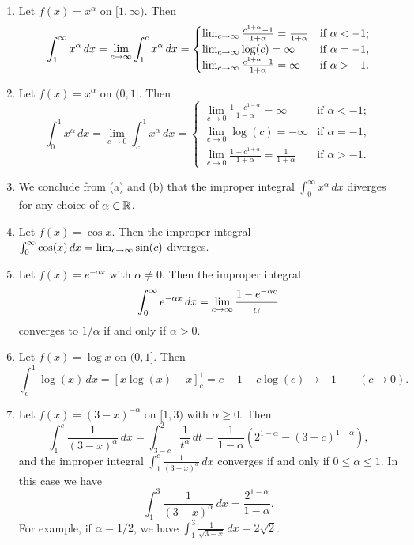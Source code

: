 \documentclass[10pt, a4paper]{article}
\begin{document}
\begin{enumerate}[label = (\alph*)]
    \item Let $f(x) = x ^ {\alpha}$ on $[1, \infty)$.
    Then
    \[
    \int_{1}^{\infty}x ^ {\alpha}\,dx = \liminfty[c]\int_{1}^{c}x ^ {\alpha}\,dx =
    \begin{cases}
        \liminfty[c]\frac{c ^ {1 + \alpha} - 1}{1 + \alpha} = \frac{1}{1 + \alpha} &\text{if } \alpha < -1; \\
        \liminfty[c]\log(c) = \infty &\text{if } \alpha = -1, \\
        \liminfty[c]\frac{c ^ {1 + \alpha} - 1}{1 + \alpha} = \infty &\text{if } \alpha > -1.
    \end{cases}
    \]
    
    \item Let $f(x) = x ^ {\alpha}$ on $(0, 1]$.
    Then
    \[
    \int_{0}^{1}x ^ {\alpha}\,dx = \lim_{c \rightarrow 0}\int_{c}^{1}x ^ {\alpha}\,dx =
    \begin{cases}
        \lim_{c \rightarrow 0}\frac{1 - c ^ {1 - \alpha}}{1 - \alpha} = \infty &\text{if } \alpha < -1; \\
        \lim_{c \rightarrow 0}\log(c) = -\infty &\text{if } \alpha = -1, \\
        \lim_{c \rightarrow 0}\frac{1 - c ^ {1 + \alpha}}{1 + \alpha} = \frac{1}{1 + \alpha} &\text{if } \alpha > -1.
    \end{cases}
    \]
    
    \item We conclude from (a) and (b) that the improper integral $\int_{0}^{\infty}x ^ {\alpha}\,dx$ diverges for any choice of $\alpha \in \R$.
    
    \item Let $f(x) = \cos{x}$.
    Then the improper integral $\int_{0}^{\infty}\cos(x)\,dx = \liminfty[c]\sin(c)$ diverges.

    \item Let $f(x) = e ^ {-\alpha x}$ with $\alpha \neq 0$.
    Then the improper integral
    \[
    \int_{0}^{\infty}e ^ {-\alpha x}\,dx = \liminfty[c]\frac{1 - e ^ {-\alpha c}}{\alpha}
    \]
    converges to $1 / \alpha$ if and only if $\alpha > 0$.

    \item Let $f(x) = \log{x}$ on $(0, 1]$.
    Then
    \[
    \int_{c}^{1}\log(x)\,dx = [x\log(x) - x]_{c}^{1} = c - 1 - c\log(c) \rightarrow -1\qquad(c \rightarrow 0).
    \]
    
    \item Let $f(x) = (3 - x) ^ {-\alpha}$ on $[1, 3)$ with $\alpha \geq 0$.
    Then
    \[
    \int_{1}^{c}\frac{1}{(3 - x) ^ {\alpha}}\,dx = \int_{3 - c}^{2}\frac{1}{t ^ {\alpha}}\,dt = \frac{1}{1 - \alpha}(2 ^ {1 - \alpha} - (3 - c) ^ {1 - \alpha}),
    \]
    and the improper integral $\int_{1}^{c}\frac{1}{(3 - x) ^ {\alpha}}\,dx$ converges if and only if $0 \leq \alpha \leq 1$.
    In this case we have
    \[
    \int_{1}^{3}\frac{1}{(3 - x) ^ {\alpha}}\,dx = \frac{2 ^ {1 - \alpha}}{1 - \alpha}.
    \]
    For example,
    if $\alpha = 1 / 2$,
    we have $\int_{1}^{3}\frac{1}{\sqrt{3 - x}}\,dx = 2\sqrt{2}$.


\end{enumerate}
\end{document}

